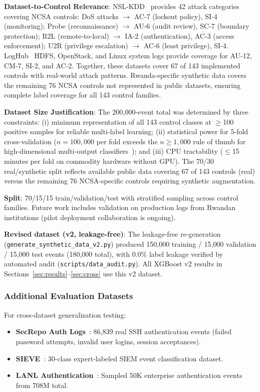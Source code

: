 \documentclass[futureinternet,article,submit,pdftex,moreauthors]{Definitions/mdpi}
\begin{document}
\textbf{Dataset-to-Control Relevance}: NSL-KDD~\cite{nslkdd} provides 42 attack categories
covering NCSA controls: DoS attacks $\rightarrow$ AC-7 (lockout policy), SI-4 (monitoring);
Probe (reconnaissance) $\rightarrow$ AU-6 (audit review), SC-7 (boundary protection);
R2L (remote-to-local) $\rightarrow$ IA-2 (authentication), AC-3 (access enforcement);
U2R (privilege escalation) $\rightarrow$ AC-6 (least privilege), SI-4. LogHub~\cite{loghub}
HDFS, OpenStack, and Linux system logs provide coverage for AU-12, CM-7, SI-2, and AC-2.
Together, these datasets cover 67 of 143 implemented controls with real-world attack patterns.
Rwanda-specific synthetic data covers the remaining 76 NCSA controls not represented in
public datasets, ensuring complete label coverage for all 143 control families.

\textbf{Dataset Size Justification}: The 200{,}000-event total was determined by three
constraints: (i) minimum representation of all 143 control classes at $\geq$100 positive
samples for reliable multi-label learning; (ii) statistical power for 5-fold cross-validation
($n = 100{,}000$ per fold exceeds the $n \geq 1{,}000$ rule of thumb for high-dimensional
multi-output classifiers~\cite{tsoumakas2007}); and (iii) CPU tractability ($\leq$15 minutes
per fold on commodity hardware without GPU). The 70/30 real/synthetic split reflects available
public data covering 67 of 143 controls (real) versus the remaining 76 NCSA-specific controls
requiring synthetic augmentation.

\textbf{Split}: 70/15/15 train/validation/test with stratified sampling across control
families. Future work includes validation on production logs from Rwandan institutions
(pilot deployment collaboration is ongoing).

\textbf{Revised dataset (v2, leakage-free)}: The leakage-free re-generation (\texttt{generate\_synthetic\_data\_v2.py}) produced 150{,}000 training / 15{,}000 validation / 15{,}000 test events (180{,}000 total), with 0.0\% label leakage verified by automated audit (\texttt{scripts/data\_audit.py}). All XGBoost v2 results in Sections~\ref{sec:results}--\ref{sec:cross} use this v2 dataset.

\subsubsection{Additional Evaluation Datasets}

For cross-dataset generalization testing:
\begin{itemize}
\item \textbf{SecRepo Auth Logs}~\cite{secrepo}: 86{,}839 real SSH authentication events
(failed password attempts, invalid user logins, session acceptances).
\item \textbf{SIEVE}~\cite{sieve_dataset}: 30-class expert-labeled SIEM event classification
dataset.
\item \textbf{LANL Authentication}~\cite{lanl_auth}: Sampled 50K enterprise authentication
events from 708M total.
\end{itemize}
\end{document}
